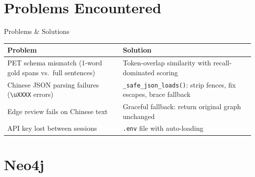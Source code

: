 \documentclass[aspectratio=169, 12pt]{beamer}
\begin{document}
\section{Problems Encountered}

\begin{frame}{Problems \& Solutions}
\begin{tabular}{p{4.5cm}p{6.5cm}}
\toprule
\textbf{Problem} & \textbf{Solution} \\
\midrule
PET schema mismatch (1-word gold spans vs.\ full sentences) & Token-overlap similarity with recall-dominated scoring \\[0.4em]
Chinese JSON parsing failures (\texttt{\textbackslash uXXXX} errors) & \texttt{\_safe\_json\_loads()}: strip fences, fix escapes, brace fallback \\[0.4em]
Edge review fails on Chinese text & Graceful fallback: return original graph unchanged \\[0.4em]
API key lost between sessions & \texttt{.env} file with auto-loading \\
\bottomrule
\end{tabular}
\end{frame}

\section{Neo4j}
\end{document}
